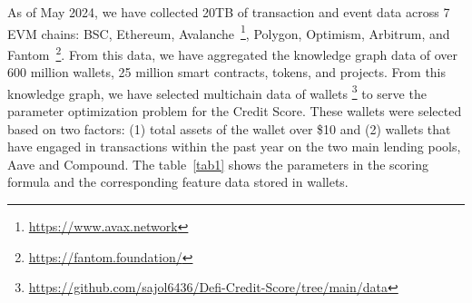 \documentclass[../ICIT-Paper-2024.tex]{subfiles}
\begin{document}
As of May 2024, we have collected 20TB of transaction and event data across 7 EVM chains: BSC, Ethereum, Avalanche~\footnote{\href{https://www.avax.network/}{https://www.avax.network}}, Polygon, Optimism, Arbitrum, and Fantom~\footnote{\href{https://fantom.foundation/}{https://fantom.foundation/}}. From this data, we have aggregated the knowledge graph data of over 600 million wallets, 25 million smart contracts,  tokens, and  projects. From this knowledge graph, we have selected multichain data of  wallets \footnote{\href{https://github.com/sajol6436/Defi-Credit-Score/tree/main/data}{https://github.com/sajol6436/Defi-Credit-Score/tree/main/data}} to serve the parameter optimization problem for the Credit Score. These  wallets were selected based on two factors: (1) total assets of the wallet over \$10 and (2) wallets that have engaged in transactions within the past year on the two main lending pools, Aave and Compound. The table~\ref{tab1} shows the parameters in the scoring formula and the corresponding feature data stored in wallets.
\end{document}
